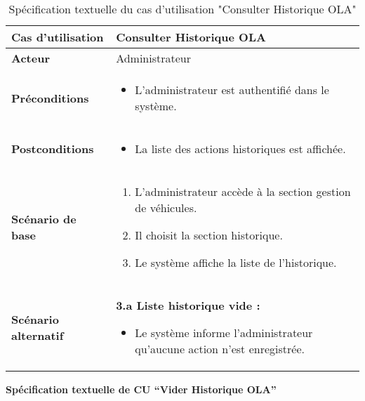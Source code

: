 \documentclass[a4paper,11pt]{report}
\begin{document}
\begin{table}[H]
  \centering
  \renewcommand{\arraystretch}{1.5}
  \caption{Spécification textuelle du cas d'utilisation "Consulter Historique OLA"}
  \begin{tabularx}{\textwidth}{|l|X|}
    \hline
    \textbf{Cas d'utilisation} & Consulter Historique OLA \\ \hline
    \textbf{Acteur}            & Administrateur \\ \hline
    \textbf{Préconditions}     & 
      \begin{itemize}
        \item L’administrateur est authentifié dans le système.
      \end{itemize} \\ \hline
    \textbf{Postconditions}    & 
      \begin{itemize}
        \item La liste des actions historiques est affichée.
      \end{itemize} \\ \hline
    \textbf{Scénario de base}  & 
      \begin{enumerate}
        \item L’administrateur accède à la section gestion de véhicules.
        \item Il choisit la section historique.
        \item Le système affiche la liste de l'historique.
      \end{enumerate} \\ \hline
    \textbf{Scénario alternatif} & 
      \textbf{3.a Liste historique vide :}
      \begin{itemize}
        \item Le système informe l’administrateur qu’aucune action n’est enregistrée.
      \end{itemize} \\ \hline
  \end{tabularx}
\end{table}


\textbf{Spécification textuelle de CU “Vider Historique OLA”}
\end{document}
